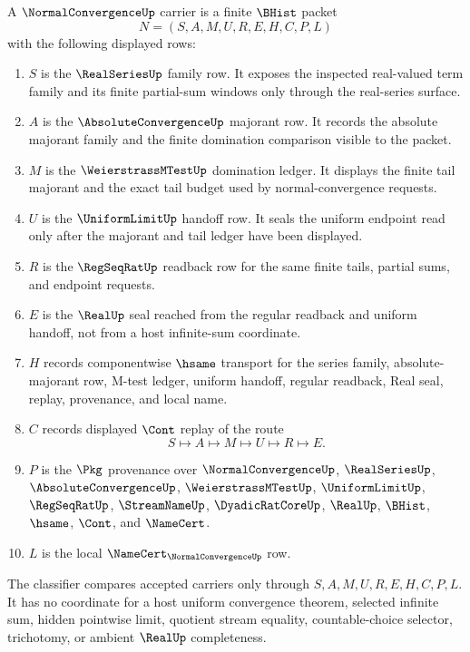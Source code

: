 \begin{definition}
\label{def:normal-convergence-carrier}
A $\NormalConvergenceUp$ carrier is a finite $\BHist$ packet
$$
N=(S,A,M,U,R,E,H,C,P,L)
$$
with the following displayed rows:
\begin{enumerate}
\item $S$ is the $\RealSeriesUp$ family row. It exposes the inspected real-valued term family and its finite partial-sum windows only through the real-series surface.
\item $A$ is the $\AbsoluteConvergenceUp$ majorant row. It records the absolute majorant family and the finite domination comparison visible to the packet.
\item $M$ is the $\WeierstrassMTestUp$ domination ledger. It displays the finite tail majorant and the exact tail budget used by normal-convergence requests.
\item $U$ is the $\UniformLimitUp$ handoff row. It seals the uniform endpoint read only after the majorant and tail ledger have been displayed.
\item $R$ is the $\RegSeqRatUp$ readback row for the same finite tails, partial sums, and endpoint requests.
\item $E$ is the $\RealUp$ seal reached from the regular readback and uniform handoff, not from a host infinite-sum coordinate.
\item $H$ records componentwise $\hsame$ transport for the series family, absolute-majorant row, M-test ledger, uniform handoff, regular readback, Real seal, replay, provenance, and local name.
\item $C$ records displayed $\Cont$ replay of the route
$$
S\longmapsto A\longmapsto M\longmapsto U\longmapsto R\longmapsto E .
$$
\item $P$ is the $\Pkg$ provenance over $\NormalConvergenceUp$, $\RealSeriesUp$, $\AbsoluteConvergenceUp$, $\WeierstrassMTestUp$, $\UniformLimitUp$, $\RegSeqRatUp$, $\StreamNameUp$, $\DyadicRatCoreUp$, $\RealUp$, $\BHist$, $\hsame$, $\Cont$, and $\NameCert$.
\item $L$ is the local $\NameCert_{\NormalConvergenceUp}$ row.
\end{enumerate}
The classifier compares accepted carriers only through $S,A,M,U,R,E,H,C,P,L$. It has no coordinate for a host uniform convergence theorem, selected infinite sum, hidden pointwise limit, quotient stream equality, countable-choice selector, trichotomy, or ambient $\RealUp$ completeness.
\end{definition}


